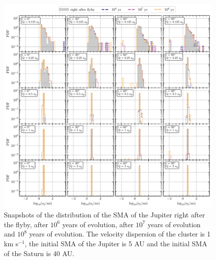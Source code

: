 \documentclass[twocolumn]{aastex63}
\begin{document}
\begin{figure}
    \includegraphics[width=\textwidth]{figs/HJ_aj-r8.pdf}
    \caption{Snapshots of the distribution of the SMA of the Jupiter right after the flyby, after $10^6$ years of evolution, after $10^7$ years of evolution and $10^8$ years of evolution. The velocity dispersion of the cluster is 1 km s$^{-1}$, the initial SMA of the Jupiter is 5 AU and the initial SMA of the Saturn is {\color{red}40} AU. }
    \label{fig:hj-aj-s1-r8}
\end{figure}
\end{document}
